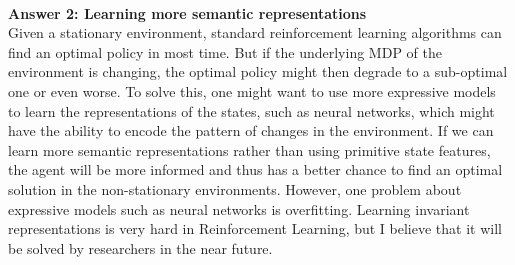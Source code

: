 \documentclass[12pt,a4paper]{article}
\begin{document}
\ \\
\noindent \textbf{Answer 2: Learning more semantic representations} \ \\
Given a stationary environment, standard reinforcement learning algorithms can find an optimal policy in most time. But if the underlying MDP of the environment is changing, the optimal policy might then degrade to a sub-optimal one or even worse. To solve this, one might want to use more expressive models to learn the representations of the states, such as neural networks, which might have the ability to encode the pattern of changes in the environment. If we can learn more semantic representations rather than using primitive state features, the agent will be more informed and thus has a better chance to find an optimal solution in the non-stationary environments. However, one problem about expressive models such as neural networks is overfitting. Learning invariant representations is very hard in Reinforcement Learning, but I believe that it will be solved by researchers in the near future.
\end{document}
